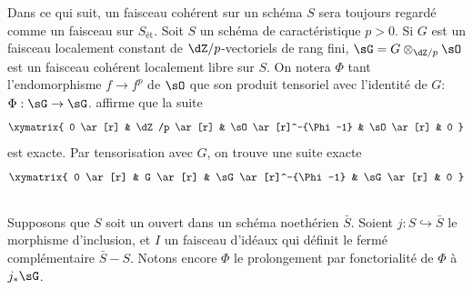 Dans ce qui suit, un faisceau cohérent sur un schéma $S$ sera toujours 
regardé comme un faisceau sur $S_\text{ét}$. Soit $S$ un schéma de 
caractéristique $p>0$. Si $G$ est un faisceau localement constant de 
$\dZ/p$-vectoriels de rang fini, $\sG=G\otimes_{\dZ/p}\sO$ est un faisceau 
cohérent localement libre sur $S$. On notera $\Phi$ tant l'endomorphisme 
$f\to f^p$ de $\sO$ que son produit tensoriel avec l'identité de 
$G$: $\Phi:\sG\to\sG$.   
affirme que la suite 
\[\xymatrix{
  0 \ar[r] 
    & \dZ/p \ar[r] 
    & \sO \ar[r]^-{\Phi-1} 
    & \sO \ar[r] 
    & 0
}\]
est exacte. Par tensorisation avec $G$, on trouve une suite exacte 
\[\xymatrix{
  0 \ar[r] 
    & G \ar[r] 
    & \sG \ar[r]^-{\Phi-1} 
    & \sG \ar[r] 
    & 0
}\]





\subsection{}\label{III:3-2}

Supposons que $S$ soit un ouvert dans un schéma noethérien $\bar S$. 
Soient $j:S\hookrightarrow \bar S$ le morphisme d'inclusion, et $I$ un 
faisceau d'idéaux qui définit le fermé complémentaire 
$\bar S-S$. Notons encore $\Phi$ le prolongement par fonctorialité 
de $\Phi$ à $j_*\sG$. 





